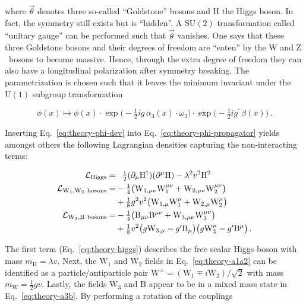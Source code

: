 where $\vec{\theta}$ denotes three so-called ``Goldstone'' bosons and $\mathrm{H}$ the Higgs boson. In fact, the symmetry still exists but is ``hidden''. A $\mathrm{SU(2)}$ transformation called ``unitary gauge'' can be performed such that $\vec{\theta}$ vanishes. One says that these three Goldstone bosons and their degrees of freedom are ``eaten'' by the $\mathrm{W}$ and $\mathrm{Z}$~bosons to become massive. Hence, through the extra degree of freedom they can also have a longitudinal polarization after symmetry breaking. The parametrization is chosen such that it leaves the minimum invariant under the $\mathrm{U(1)}$ subgroup transformation

\begin{equation}
\phi(x)\mapsto\phi(x)\cdot\exp\Big(-\tfrac{1}{2}ig\,\alpha_{3}(x)\cdot\omega_{3}\Big)\cdot\exp\Big(-\tfrac{1}{2}ig^{\prime}\,\beta(x)\Big)\,. \label{eq:theory-broken-u1-trans}
\end{equation}

Inserting Eq.~\ref{eq:theory-phi-dev} into Eq.~\ref{eq:theory-phi-propagator} yields amongst others the following Lagrangian densities capturing the non-interacting terms:

\begin{subequations}
\begin{align}
\mathcal{L}_\mathrm{Higgs}=&\hphantom{-}\tfrac{1}{2}(\partial_{\mu}\mathrm{H}^{\dagger})(\partial^{\mu}\mathrm{H})-\lambda^2 v^2 \mathrm{H}^2 \label{eq:theory-higgs} \\
\mathcal{L}_\mathrm{W_1,W_2~bosons}=&-\tfrac{1}{4}\big(\mathrm{W}_{1,\mu\nu}\mathrm{W}^{\mu\nu}_{1}+\mathrm{W}_{2,\mu\nu}\mathrm{W}^{\mu\nu}_{2}\big)\nonumber\\&+\tfrac{1}{8}g^2 v^2 \big(\mathrm{W}_{1,\mu} \mathrm{W}_{1}^{\mu}+\mathrm{W}_{2,\mu} \mathrm{W}_{2}^{\mu}\big) \label{eq:theory-a1a2} \\
\mathcal{L}_\mathrm{W_3,B~bosons}=&-\tfrac{1}{4}\big(\mathrm{B}_{\mu\nu}\mathrm{B}^{\mu\nu}+\mathrm{W}_{3,\mu\nu}\mathrm{W}^{\mu\nu}_{3}\big)\nonumber\\
&+\tfrac{1}{8}v^2 \big(g\mathrm{W}_{3,\mu}-g^{\prime}\mathrm{B}_\mu\big)\big(g\mathrm{W}_{3}^{\mu}-g^{\prime}\mathrm{B}^\mu\big)\,. \label{eq:theory-a3b}
\end{align}
\end{subequations}

The first term (Eq.~\ref{eq:theory-higgs}) describes the free scalar Higgs boson with mass $m_\mathrm{H}=\lambda v$. Next, the $\mathrm{W}_{1}$ and $\mathrm{W}_{2}$
fields in Eq.~\ref{eq:theory-a1a2} can be identified as a particle/antiparticle pair $\mathrm{W}^{\pm}=(\mathrm{W}_1\mp i\mathrm{W}_2)/\sqrt{2}$ with mass $m_\mathrm{W}=\frac{1}{2}gv$. Lastly, the fields $\mathrm{W}_3$ and $\mathrm{B}$ appear to be in a mixed mass state in Eq.~\ref{eq:theory-a3b}. By performing a rotation of the couplings

